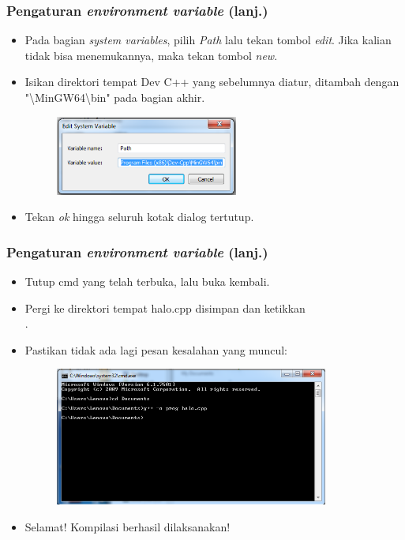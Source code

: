 \begin{frame}
\frametitle{Pengaturan \textit{environment variable} (lanj.)}
\begin{itemize}
  \item Pada bagian \textit{system variables}, pilih \textit{Path} lalu tekan tombol \textit{edit}. Jika kalian tidak bisa menemukannya, maka tekan tombol \textit{new}.
  \item Isikan direktori tempat Dev C++ yang sebelumnya diatur, ditambah dengan "\textbackslash MinGW64\textbackslash bin" pada bagian akhir.
  \begin{figure}
    \includegraphics[width=6cm]{asset/cpp-compile-2.png}
  \end{figure}
  \item Tekan \textit{ok} hingga seluruh kotak dialog tertutup.
\end{itemize}
\end{frame}

\begin{frame}
\frametitle{Pengaturan \textit{environment variable} (lanj.)}
\begin{itemize}
  \item Tutup cmd yang telah terbuka, lalu buka kembali.
  \item Pergi ke direktori tempat halo.cpp disimpan dan ketikkan \\ \compilehelo.
  \item Pastikan tidak ada lagi pesan kesalahan yang muncul:
  \begin{figure}
    \includegraphics[width=9cm]{asset/cpp-compile-3.png}
  \end{figure}
  \item Selamat! Kompilasi berhasil dilaksanakan!
\end{itemize}
\end{frame}

